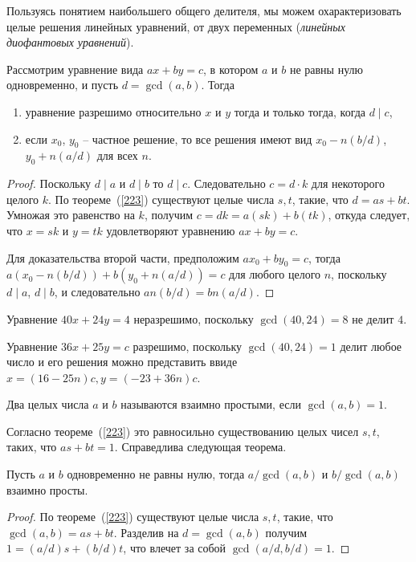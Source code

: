 \documentclass[14pt]{extreport}
\begin{document}
Пользуясь понятием наибольшего общего делителя, мы можем
охарактеризовать целые решения линейных уравнений, от
двух переменных (\emph{линейных диофантовых уравнений}).
\begin{theorem} Рассмотрим уравнение вида $ax+by = c$,
 в котором $a$ и $b$ не равны нулю одновременно,
 и пусть $d = \gcd(a, b)$. Тогда
\begin{enumerate}
  \item уравнение разрешимо относительно $x$ и $y$ тогда и
    только тогда, когда $d \mid c$,
  \item если $x_0$, $y_0$ -- частное решение, то все решения
    имеют вид $x_0 - n (b/d)$, $y_0 + n (a/d)$ для всех $n$.
\end{enumerate}
\end{theorem}
\begin{proof}
Поскольку $d \mid a$ и $d \mid b$  то $d \mid c$. Следовательно
$c= d \cdot k$ для некоторого целого $k$.  По теореме~(\ref{223})
существуют целые числа $s, t$, такие, что $d = as+bt$.
Умножая это равенство на $k$, получим $c= dk = a(sk) + b(tk)$,
откуда следует, что $x = sk$ и $y = tk$ удовлетворяют
уравнению $ax+by = c$.

Для доказательства второй части, предположим $ax_0+by_0 = c$,
тогда $a(x_0- n (b/d))+ b(y_0+ n (a/d)) = c$ для любого
целого $n$, поскольку $d \mid a$, $d \mid b$, и следовательно
$a n (b/d) = b n (a/d)$.
\end{proof}

\begin{example}
Уравнение $40x+ 24y = 4$ неразрешимо, поскольку $\gcd(40, 24) = 8$ не
делит $4$.

Уравнение $36x+ 25y = c$ разрешимо, поскольку $\gcd(40, 24) = 1$
делит любое число и его решения можно представить ввиде
$x= (16 - 25n)c, y=(-23+36n)c$.
\end{example}

\begin{definition}
Два целых числа $a$ и $b$ называются взаимно простыми, если
$\gcd(a,b)=1$.
\end{definition}
Согласно теореме~(\ref{223}) это равносильно существованию
целых чисел $s, t$, таких, что $as+bt =1$. Справедлива
следующая теорема.

\begin{theorem}
Пусть $a$ и $b$ одновременно не равны нулю,
тогда $a/\gcd(a, b)$ и $b/\gcd(a, b)$ взаимно просты.
\label{225}
\end{theorem}
\begin{proof}
По теореме~(\ref{223}) существуют
целые числа $s, t$, такие, что $\gcd(a, b)=as+bt$. Разделив на $d=\gcd(a, b)$ получим
$1= (a/d)s+(b/d)t$, что влечет за собой $\gcd(a/d, b/d)=1$.
\end{proof}
\end{document}

